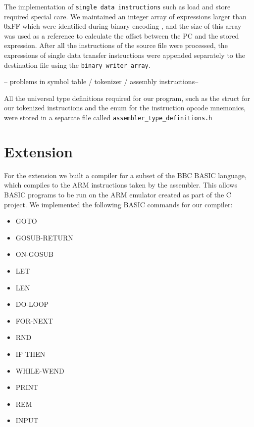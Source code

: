 \documentclass[11pt, letterpaper]{article}
\begin{document}
The implementation of \verb|single data instructions| such as load and store required special care. We maintained an integer array of expressions larger than 0xFF which were identified during binary encoding , and the size of this array was used as a reference to calculate the offset between the PC and the stored expression. After all the instructions of the source file were processed, the expressions of single data transfer instructions were appended separately to the destination file using the \verb|binary_writer_array|.
\\ \newline

-- problems in symbol table / tokenizer / assembly instructions--

All the universal type definitions required for our program, such as the struct for our tokenized instructions and the enum for the instruction opcode mnemonics, were stored in a separate file called \verb|assembler_type_definitions.h|

\section{Extension}

For the extension we built a compiler for a subset of the BBC BASIC language, which compiles to the ARM instructions taken by the assembler. This allows BASIC programs to be run on the ARM emulator created as part of the C project. We implemented the following BASIC commands for our compiler:
\begin{itemize}
\item GOTO
\item GOSUB-RETURN
\item ON-GOSUB
\item LET
\item LEN
\item DO-LOOP
\item FOR-NEXT
\item RND
\item IF-THEN
\item WHILE-WEND
\item PRINT 
\item REM
\item INPUT 
\end{itemize}
\end{document}
